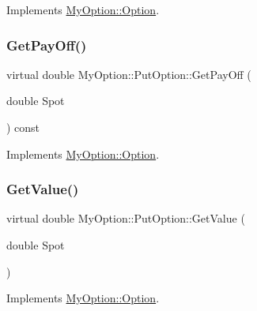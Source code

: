 Implements \hyperlink{classMyOption_1_1Option_a4416faa432b5004e449394056c7f1363}{My\+Option\+::\+Option}.

\hypertarget{classMyOption_1_1PutOption_a5f1609850308f1770d9ad6051ec55f12}{}\label{classMyOption_1_1PutOption_a5f1609850308f1770d9ad6051ec55f12} 
\subsubsection{\texorpdfstring{Get\+Pay\+Off()}{GetPayOff()}}
{\footnotesize\ttfamily virtual double My\+Option\+::\+Put\+Option\+::\+Get\+Pay\+Off (\begin{DoxyParamCaption}\item[{double}]{Spot }\end{DoxyParamCaption}) const\hspace{0.3cm}{\ttfamily [virtual]}}



Implements \hyperlink{classMyOption_1_1Option_a4b6b84dc485153ffadfb32afa9bb52f3}{My\+Option\+::\+Option}.

\hypertarget{classMyOption_1_1PutOption_aebfa13ebcf310890ecb512e110667832}{}\label{classMyOption_1_1PutOption_aebfa13ebcf310890ecb512e110667832} 
\subsubsection{\texorpdfstring{Get\+Value()}{GetValue()}\hspace{0.1cm}{\footnotesize\ttfamily [1/3]}}
{\footnotesize\ttfamily virtual double My\+Option\+::\+Put\+Option\+::\+Get\+Value (\begin{DoxyParamCaption}\item[{double}]{Spot }\end{DoxyParamCaption})\hspace{0.3cm}{\ttfamily [virtual]}}



Implements \hyperlink{classMyOption_1_1Option_aff32b402a5e44fca9e5a22a142fbbdd6}{My\+Option\+::\+Option}.

\hypertarget{classMyOption_1_1PutOption_ad6bc5150fe62246232f8643f72886dd9}{}\label{classMyOption_1_1PutOption_ad6bc5150fe62246232f8643f72886dd9} 
